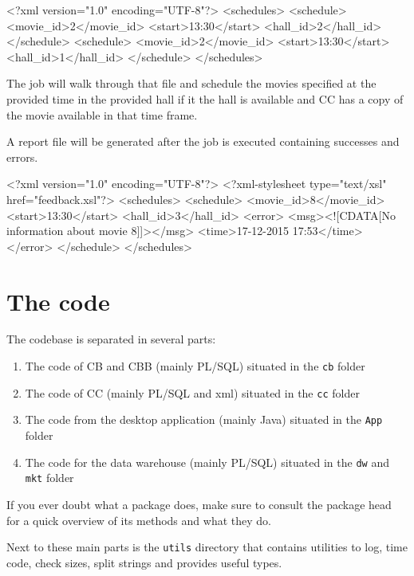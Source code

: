 \documentclass[a4paper]{article}
\begin{document}
\begin{xmlcode}
<?xml version="1.0" encoding="UTF-8"?>
<schedules>
    <schedule>
        <movie_id>2</movie_id>
        <start>13:30</start>
        <hall_id>2</hall_id>
    </schedule>
    <schedule>
        <movie_id>2</movie_id>
        <start>13:30</start>
        <hall_id>1</hall_id>
    </schedule>
</schedules>
\end{xmlcode}

The job will walk through that file and schedule the movies specified at the provided time in the provided hall if it the hall is available and CC has a copy of the movie available in that time frame.\par
A report file will be generated after the job is executed containing successes and errors.

\begin{xmlcode}
<?xml version="1.0" encoding="UTF-8"?>
<?xml-stylesheet type="text/xsl" href="feedback.xsl"?>
<schedules>
    <schedule>
        <movie_id>8</movie_id>
        <start>13:30</start>
        <hall_id>3</hall_id>
        <error>
            <msg><![CDATA[No information about movie 8]]></msg>
            <time>17-12-2015 17:53</time>
        </error>
    </schedule>
</schedules>
\end{xmlcode}

\section{The code}

The codebase is separated in several parts:
\begin{enumerate}
	\item The code of CB and CBB (mainly PL/SQL) situated in the \texttt{cb} folder
	\item The code of CC (mainly PL/SQL and xml) situated in the \texttt{cc} folder
	\item The code from the desktop application (mainly Java) situated in the \texttt{App} folder
	\item The code for the data warehouse (mainly PL/SQL) situated in the \texttt{dw} and \texttt{mkt} folder
\end{enumerate}
If you ever doubt what a package does, make sure to consult the package head for a quick overview of its methods and what they do.\par
Next to these main parts is the \texttt{utils} directory that contains utilities to log, time code, check sizes, split strings and provides useful types.
\end{document}
